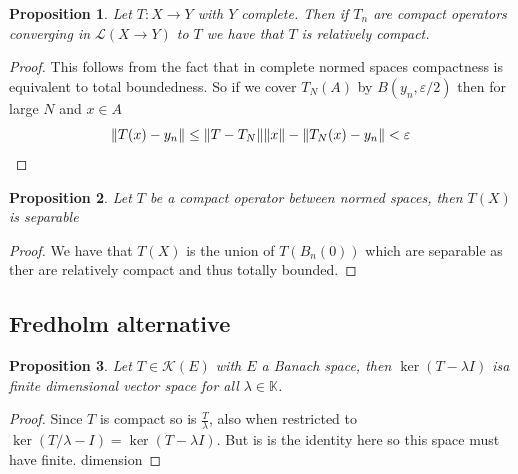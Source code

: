 \documentclass[12pt]{article}
\newtheorem{proposition}{Proposition}
\begin{document}
\begin{proposition}
	Let $T:X\to Y$ with $Y$ complete. Then if $T_n$ are compact operators converging in $\mathcal{L}(X\to Y)$ to $T$ we have that $T$ is relatively compact.
\end{proposition}
\begin{proof}
	This follows from the fact that in complete normed spaces compactness is equivalent to total boundedness. So if we cover $T_N(A)$ by $B(y_n,\varepsilon/2)$ then for large $N$ and $x\in A$
	\begin{equation*}
		\norm{T(x)-y_n}\leq \norm{T-T_N}\norm{x}-\norm{T_N(x)-y_n}<\varepsilon
	\end{equation*}
\end{proof}
\begin{proposition}
	Let $T$ be a compact operator between normed spaces, then $T(X)$ is separable
\end{proposition}
\begin{proof}
	We have that $T(X)$ is the union of $T(B_n(0))$ which are separable as ther are relatively compact and thus totally bounded.
\end{proof}
\subsection{Fredholm alternative}
\begin{proposition}
	Let $T\in\mathcal{K}(E)$ with $E$ a Banach space, then $\ker(T-\lambda I)$ isa finite dimensional vector space for all $\lambda\in\mathbb{K}$.
\end{proposition}
\begin{proof}
	Since $T$ is compact so is $\frac{T}{\lambda}$, also when restricted to $\ker(T/\lambda-I)=\ker(T-\lambda I)$. But is is the identity here so this space must have finite. dimension
\end{proof}
\end{document}
